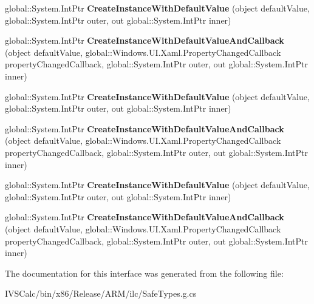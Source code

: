 \begin{DoxyCompactItemize}
\item 
\mbox{\label{interface_windows_1_1_u_i_1_1_xaml_1_1_i_property_metadata_factory_a926290cdd228b3558307d0600c236f50}} 
global\+::\+System.\+Int\+Ptr {\bfseries Create\+Instance\+With\+Default\+Value} (object default\+Value, global\+::\+System.\+Int\+Ptr outer, out global\+::\+System.\+Int\+Ptr inner)
\item 
\mbox{\label{interface_windows_1_1_u_i_1_1_xaml_1_1_i_property_metadata_factory_a42ba155ca7cc180032675c2cd37593e2}} 
global\+::\+System.\+Int\+Ptr {\bfseries Create\+Instance\+With\+Default\+Value\+And\+Callback} (object default\+Value, global\+::\+Windows.\+U\+I.\+Xaml.\+Property\+Changed\+Callback property\+Changed\+Callback, global\+::\+System.\+Int\+Ptr outer, out global\+::\+System.\+Int\+Ptr inner)
\item 
\mbox{\label{interface_windows_1_1_u_i_1_1_xaml_1_1_i_property_metadata_factory_a926290cdd228b3558307d0600c236f50}} 
global\+::\+System.\+Int\+Ptr {\bfseries Create\+Instance\+With\+Default\+Value} (object default\+Value, global\+::\+System.\+Int\+Ptr outer, out global\+::\+System.\+Int\+Ptr inner)
\item 
\mbox{\label{interface_windows_1_1_u_i_1_1_xaml_1_1_i_property_metadata_factory_a42ba155ca7cc180032675c2cd37593e2}} 
global\+::\+System.\+Int\+Ptr {\bfseries Create\+Instance\+With\+Default\+Value\+And\+Callback} (object default\+Value, global\+::\+Windows.\+U\+I.\+Xaml.\+Property\+Changed\+Callback property\+Changed\+Callback, global\+::\+System.\+Int\+Ptr outer, out global\+::\+System.\+Int\+Ptr inner)
\item 
\mbox{\label{interface_windows_1_1_u_i_1_1_xaml_1_1_i_property_metadata_factory_a926290cdd228b3558307d0600c236f50}} 
global\+::\+System.\+Int\+Ptr {\bfseries Create\+Instance\+With\+Default\+Value} (object default\+Value, global\+::\+System.\+Int\+Ptr outer, out global\+::\+System.\+Int\+Ptr inner)
\item 
\mbox{\label{interface_windows_1_1_u_i_1_1_xaml_1_1_i_property_metadata_factory_a42ba155ca7cc180032675c2cd37593e2}} 
global\+::\+System.\+Int\+Ptr {\bfseries Create\+Instance\+With\+Default\+Value\+And\+Callback} (object default\+Value, global\+::\+Windows.\+U\+I.\+Xaml.\+Property\+Changed\+Callback property\+Changed\+Callback, global\+::\+System.\+Int\+Ptr outer, out global\+::\+System.\+Int\+Ptr inner)
\end{DoxyCompactItemize}


The documentation for this interface was generated from the following file\+:\begin{DoxyCompactItemize}
\item 
I\+V\+S\+Calc/bin/x86/\+Release/\+A\+R\+M/ilc/Safe\+Types.\+g.\+cs\end{DoxyCompactItemize}
